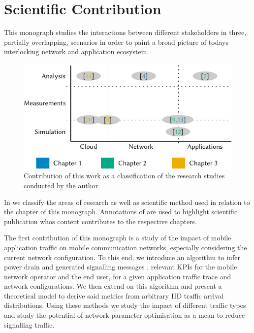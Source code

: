 \section{Scientific Contribution}\label{sec:introduction:scientific_contribution}
This monograph studies the interactions between different stakeholders in three, partially overlapping, scenarios in order to paint a broad picture of todays interlocking network and application ecosystem.

\begin{figure}
\centering
\includegraphics{figures/publications}
\caption{Contribution of this work as a classification of the research studies conducted by the author}\label{fig:introduction:publications}
\end{figure}

In  we classify the areas of research as well as scientific method used in relation to the chapter of this monograph.
Annotations of are used to highlight scientific publication whos content contributes to the respective chapters.

The first contribution of this monograph is a study of the impact of mobile application traffic on mobile communication networks, especially considering the current network configuration.
To this end, we introduce an algorithm to infer power drain and generated signalling messages , relevant \glspl{KPI} for the mobile network operator and the end user, for a given application traffic trace and network configurations.
We then extend on this algorithm and present a theoretical model to derive said metrics from arbitrary \gls{IID} traffic arrival distributions.
Using these methods we study the impact of different traffic types and study the potential of network parameter optimisation as a mean to reduce signalling traffic.

